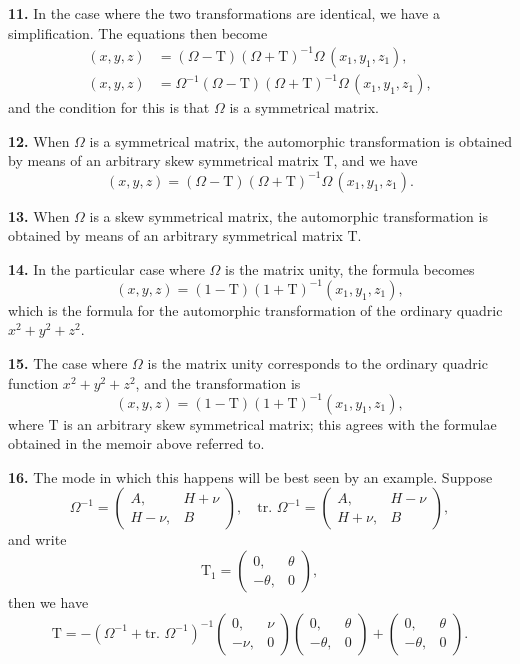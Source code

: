 \documentclass[11pt,a4paper]{book}
\begin{document}
\begin{center}
\newpage

\medskip
\noindent\textbf{11.} In the case where the two transformations are identical, we have a simplification. The equations then become
\begin{align*}
(x,y,z) &= (\Omega - \mathrm{T})(\Omega + \mathrm{T})^{-1}\Omega\,(x_1,y_1,z_1), \\
(x,y,z) &= \Omega^{-1}(\Omega - \mathrm{T})(\Omega + \mathrm{T})^{-1}\Omega\,(x_1,y_1,z_1),
\end{align*}
and the condition for this is that $\Omega$ is a symmetrical matrix.

\medskip
\noindent\textbf{12.} When $\Omega$ is a symmetrical matrix, the automorphic transformation is obtained by means of an arbitrary skew symmetrical matrix $\mathrm{T}$, and we have
\[
(x,y,z) = (\Omega - \mathrm{T})(\Omega + \mathrm{T})^{-1}\Omega\,(x_1,y_1,z_1).
\]

\medskip
\noindent\textbf{13.} When $\Omega$ is a skew symmetrical matrix, the automorphic transformation is obtained by means of an arbitrary symmetrical matrix $\mathrm{T}$.

\medskip
\noindent\textbf{14.} In the particular case where $\Omega$ is the matrix unity, the formula becomes
\[(x,y,z) = (1 - \mathrm{T})(1 + \mathrm{T})^{-1}(x_1,y_1,z_1),\]
which is the formula for the automorphic transformation of the ordinary quadric $x^2+y^2+z^2$.

\medskip
\noindent\textbf{15.} The case where $\Omega$ is the matrix unity corresponds to the ordinary quadric function $x^2+y^2+z^2$, and the transformation is
\[(x,y,z) = (1 - \mathrm{T})(1 + \mathrm{T})^{-1}(x_1,y_1,z_1),\]
where $\mathrm{T}$ is an arbitrary skew symmetrical matrix; this agrees with the formulae obtained in the memoir above referred to.

\medskip
\noindent\textbf{16.} The mode in which this happens will be best seen by an example. Suppose
\[
\Omega^{-1} = \begin{pmatrix} A, & H+\nu \\ H-\nu, & B \end{pmatrix},\quad
\text{tr. }\Omega^{-1} = \begin{pmatrix} A, & H-\nu \\ H+\nu, & B \end{pmatrix},
\]
and write
\[
\mathrm{T}_1 = \begin{pmatrix} 0, & \theta \\ -\theta, & 0 \end{pmatrix},
\]
then we have
\[
\mathrm{T} = -(\Omega^{-1} + \text{tr. }\Omega^{-1})^{-1}
\begin{pmatrix} 0, & \nu \\ -\nu, & 0 \end{pmatrix}
\begin{pmatrix} 0, & \theta \\ -\theta, & 0 \end{pmatrix}
+ \begin{pmatrix} 0, & \theta \\ -\theta, & 0 \end{pmatrix}.
\]


\end{center}
\end{document}
